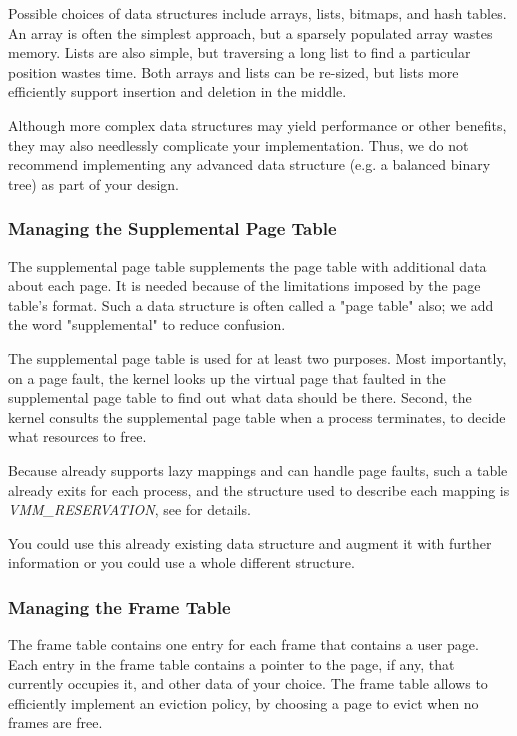 Possible choices of data structures include arrays, lists, bitmaps, and hash tables. An array is
often the simplest approach, but a sparsely populated array wastes memory. Lists are also simple,
but traversing a long list to find a particular position wastes time. Both arrays and lists can be
re-sized, but lists more efficiently support insertion and deletion in the middle.

Although more complex data structures may yield performance or other benefits, they may also
needlessly complicate your implementation. Thus, we do not recommend implementing any advanced data
structure (e.g. a balanced binary tree) as part of your design.

\subsubsection{Managing the Supplemental Page Table}
\label{sect:MngSpTable}

The supplemental page table supplements the page table with additional data about each page. It is
needed because of the limitations imposed by the page table’s format. Such a data structure is often
called a "page table" also; we add the word "supplemental" to reduce confusion.

The supplemental page table is used for at least two purposes. Most importantly, on a page fault,
the kernel looks up the virtual page that faulted in the supplemental page table to find out what
data should be there. Second, the kernel consults the supplemental page table when a process
terminates, to decide what resources to free.

Because \projectname already supports lazy mappings and can handle page faults, such a table already
exits for each process, and the structure used to describe each mapping is \textit{VMM\_RESERVATION},
see  for details.

You could use this already existing data structure and augment it with further information or you
could use a whole different structure.

\subsubsection{Managing the Frame Table}
\label{sect:MngFrameTable}

The frame table contains one entry for each frame that contains a user page. Each entry in the frame
table contains a pointer to the page, if any, that currently occupies it, and other data of your
choice. The frame table allows \projectname to efficiently implement an eviction policy, by choosing
a page to evict when no frames are free.

